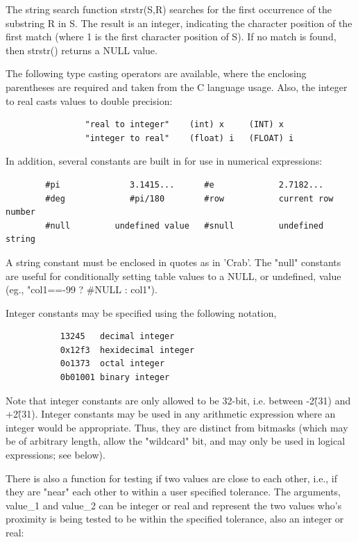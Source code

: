 \documentclass[11pt]{book}
\begin{document}
The string search function strstr(S,R) searches for the first
occurrence of the substring R in S.  The result is an integer,
indicating the character position of the first match (where 1 is the
first character position of S).  If no match is found, then strstr()
returns a NULL value.

The following type casting operators are available, where the
enclosing parentheses are required and taken from the C language
usage. Also, the integer to real casts values to double precision:

\begin{verbatim}
                "real to integer"    (int) x     (INT) x
                "integer to real"    (float) i   (FLOAT) i
\end{verbatim}

    In addition, several constants are built in  for  use  in  numerical
    expressions:


\begin{verbatim}
        #pi              3.1415...      #e             2.7182...
        #deg             #pi/180        #row           current row number
        #null         undefined value   #snull         undefined string
\end{verbatim}

    A  string constant must  be enclosed  in quotes  as in  'Crab'.  The
    "null" constants  are useful for conditionally  setting table values
    to a NULL, or undefined, value (eg., "col1==-99 ? \#NULL : col1").

    Integer constants may be specified using the following notation,
\begin{verbatim}
           13245   decimal integer
           0x12f3  hexidecimal integer
           0o1373  octal integer
           0b01001 binary integer
\end{verbatim}
    Note that integer constants are only allowed to be 32-bit, i.e.
    between -2\^(31) and +2\^(31).  Integer constants may be used in any
    arithmetic expression where an integer would be appropriate.  Thus,
    they are distinct from bitmasks (which may be of arbitrary length,
    allow the "wildcard" bit, and may only be used in logical
    expressions; see below).

    There is also a function for testing if  two  values  are  close  to
    each  other,  i.e.,  if  they are "near" each other to within a user
    specified tolerance. The  arguments,  value\_1  and  value\_2  can  be
    integer  or  real  and  represent  the two values who's proximity is
    being tested to be within the specified tolerance, also  an  integer
    or real:
\end{document}
